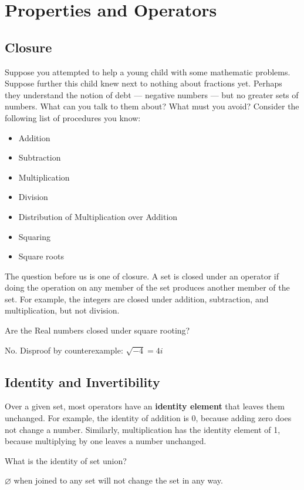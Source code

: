 
\section{Properties and Operators}
\subsection{Closure}
Suppose you attempted to help a young child with some mathematic problems.  
Suppose further this child knew next
to nothing about fractions yet.  Perhaps they understand the notion of debt --- 
negative numbers --- but no greater
sets of numbers.  What can you talk to them about?  What must you avoid?  
Consider the following list of procedures you know:

\begin{itemize}
\item Addition
\item Subtraction
\item Multiplication
\item Division
\item Distribution of Multiplication over Addition
\item Squaring
\item Square roots
\end{itemize}

The question before us is one of \gls{closure}.  A set is closed under an operator 
if doing the operation on any member of
the set produces another member of the set.  For example, the integers are closed under addition, subtraction, and multiplication, but not division.

\begin{example}
\exProblem
Are the Real numbers closed under square rooting?

\exSolution
No.  Disproof by counterexample: $\sqrt{-4} = 4i$
\end{example}

\subsection{Identity and Invertibility}
Over a given set, most operators have an \textbf{identity element} that leaves 
them unchanged.  For example, the
identity of addition is 0, because adding zero does not change a number.  
Similarly, multiplication has
the identity element of 1, because multiplying by one leaves a number unchanged.

\begin{example}
\exProblem
What is the identity of set union?

\exSolution
$\varnothing$ when joined to any set will not change the set in any way.
\end{example}

